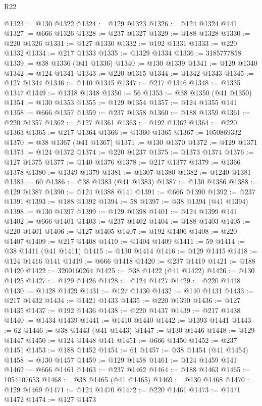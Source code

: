 \begin{lexlean}{R22}
\begin{coremodule}
@1323 := @130 @1322
@1324 := @129 @1323
@1326 := @124 @1324 @141
@1327 := @666 @1326
@1328 := @237 @1327
@1329 := @188 @1328
@1330 := @220 @1326
@1331 := @127 @1330
@1332 := @192 @1331
@1333 := @220 @1332
@1334 := @217 @1333
@1335 := @1329 @1334
@1336 := 3185777858
@1339 := @38 @1336 (@41 @1336)
@1340 := @130 @1339
@1341 := @129 @1340
@1342 := @124 @1341
@1343 := @220 @1315
@1344 := @1342 @1343
@1345 := @127 @1344
@1346 := @140 @1345
@1347 := @217 @1346
@1348 := @1335 @1347
@1349 := @1318 @1348
@1350 := 56
@1353 := @38 @1350 (@41 @1350)
@1354 := @130 @1353
@1355 := @129 @1354
@1357 := @124 @1355 @141
@1358 := @666 @1357
@1359 := @237 @1358
@1360 := @188 @1359
@1361 := @220 @1357
@1362 := @127 @1361
@1363 := @192 @1362
@1364 := @220 @1363
@1365 := @217 @1364
@1366 := @1360 @1365
@1367 := 1050869332
@1370 := @38 @1367 (@41 @1367)
@1371 := @130 @1370
@1372 := @129 @1371
@1373 := @124 @1372
@1374 := @220 @1237
@1375 := @1373 @1374
@1376 := @127 @1375
@1377 := @140 @1376
@1378 := @217 @1377
@1379 := @1366 @1378
@1380 := @1349 @1379
@1381 := @1307 @1380
@1382 := @1240 @1381
@1383 := 60
@1386 := @38 @1383 (@41 @1383)
@1387 := @130 @1386
@1388 := @129 @1387
@1390 := @124 @1388 @141
@1391 := @666 @1390
@1392 := @237 @1391
@1393 := @188 @1392
@1394 := 58
@1397 := @38 @1394 (@41 @1394)
@1398 := @130 @1397
@1399 := @129 @1398
@1401 := @124 @1399 @141
@1402 := @666 @1401
@1403 := @237 @1402
@1404 := @188 @1403
@1405 := @220 @1401
@1406 := @127 @1405
@1407 := @192 @1406
@1408 := @220 @1407
@1409 := @217 @1408
@1410 := @1404 @1409
@1411 := 59
@1414 := @38 @1411 (@41 @1411)
@1415 := @130 @1414
@1416 := @129 @1415
@1418 := @124 @1416 @141
@1419 := @666 @1418
@1420 := @237 @1419
@1421 := @188 @1420
@1422 := 3200160264
@1425 := @38 @1422 (@41 @1422)
@1426 := @130 @1425
@1427 := @129 @1426
@1428 := @124 @1427
@1429 := @220 @1418
@1430 := @1428 @1429
@1431 := @127 @1430
@1432 := @140 @1431
@1433 := @217 @1432
@1434 := @1421 @1433
@1435 := @220 @1390
@1436 := @127 @1435
@1437 := @192 @1436
@1438 := @220 @1437
@1439 := @217 @1438
@1440 := @1434 @1439
@1441 := @1410 @1440
@1442 := @1393 @1441
@1443 := 62
@1446 := @38 @1443 (@41 @1443)
@1447 := @130 @1446
@1448 := @129 @1447
@1450 := @124 @1448 @141
@1451 := @666 @1450
@1452 := @237 @1451
@1453 := @188 @1452
@1454 := 61
@1457 := @38 @1454 (@41 @1454)
@1458 := @130 @1457
@1459 := @129 @1458
@1461 := @124 @1459 @141
@1462 := @666 @1461
@1463 := @237 @1462
@1464 := @188 @1463
@1465 := 1054107653
@1468 := @38 @1465 (@41 @1465)
@1469 := @130 @1468
@1470 := @129 @1469
@1471 := @124 @1470
@1472 := @220 @1461
@1473 := @1471 @1472
@1474 := @127 @1473

\end{coremodule}
\end{lexlean}
